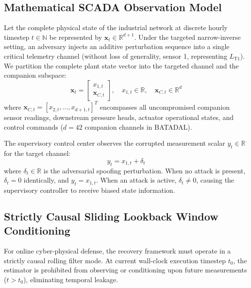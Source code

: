\documentclass[11pt,a4paper]{article}
\begin{document}
\subsection{Mathematical SCADA Observation Model}
Let the complete physical state of the industrial network at discrete hourly timestep $t \in \mathbb{N}$ be represented by $\mathbf{x}_t \in \mathbb{R}^{d+1}$. Under the targeted narrow-inverse setting, an adversary injects an additive perturbation sequence into a single critical telemetry channel (without loss of generality, sensor 1, representing $L_{\text{T1}}$). We partition the complete plant state vector into the targeted channel and the companion subspace:
\begin{equation}
\mathbf{x}_t = \begin{bmatrix} x_{1,t} \\ \mathbf{x}_{C,t} \end{bmatrix}, \quad x_{1,t} \in \mathbb{R}, \quad \mathbf{x}_{C,t} \in \mathbb{R}^d
\end{equation}
where $\mathbf{x}_{C,t} = [x_{2,t}, \dots, x_{d+1,t}]^T$ encompasses all uncompromised companion sensor readings, downstream pressure heads, actuator operational states, and control commands ($d = 42$ companion channels in BATADAL).

The supervisory control center observes the corrupted measurement scalar $y_t \in \mathbb{R}$ for the target channel:
\begin{equation}
y_t = x_{1,t} + \delta_t
\end{equation}
where $\delta_t \in \mathbb{R}$ is the adversarial spoofing perturbation. When no attack is present, $\delta_t = 0$ identically, and $y_t = x_{1,t}$. When an attack is active, $\delta_t \ne 0$, causing the supervisory controller to receive biased state information.

\subsection{Strictly Causal Sliding Lookback Window Conditioning}
For online cyber-physical defense, the recovery framework must operate in a strictly causal rolling filter mode. At current wall-clock execution timestep $t_0$, the estimator is prohibited from observing or conditioning upon future measurements ($t > t_0$), eliminating temporal leakage.
\end{document}

